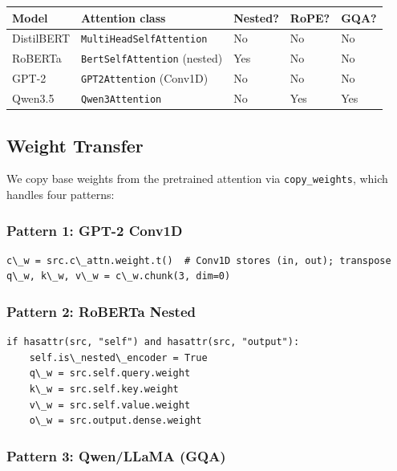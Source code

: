 \begin{table}[H]
\centering
\small
\begin{tabular}{lllll}
\toprule
\textbf{Model} & \textbf{Attention class} & \textbf{Nested?} & \textbf{RoPE?} & \textbf{GQA?} \\
\midrule
DistilBERT & \texttt{MultiHeadSelfAttention} & No & No & No \\
RoBERTa & \texttt{BertSelfAttention} (nested) & Yes & No & No \\
GPT-2 & \texttt{GPT2Attention} (Conv1D) & No & No & No \\
Qwen3.5 & \texttt{Qwen3Attention} & No & Yes & Yes \\
\bottomrule
\end{tabular}
\end{table}

\subsection{Weight Transfer}

We copy base weights from the pretrained attention via \texttt{copy\_weights}, which 
handles four patterns:

\subsubsection{Pattern 1: GPT-2 Conv1D}

\begin{lstlisting}
c\_w = src.c\_attn.weight.t()  # Conv1D stores (in, out); transpose
q\_w, k\_w, v\_w = c\_w.chunk(3, dim=0)
\end{lstlisting}

\subsubsection{Pattern 2: RoBERTa Nested}

\begin{lstlisting}
if hasattr(src, "self") and hasattr(src, "output"):
    self.is\_nested\_encoder = True
    q\_w = src.self.query.weight
    k\_w = src.self.key.weight
    v\_w = src.self.value.weight
    o\_w = src.output.dense.weight
\end{lstlisting}

\subsubsection{Pattern 3: Qwen/LLaMA (GQA)}

